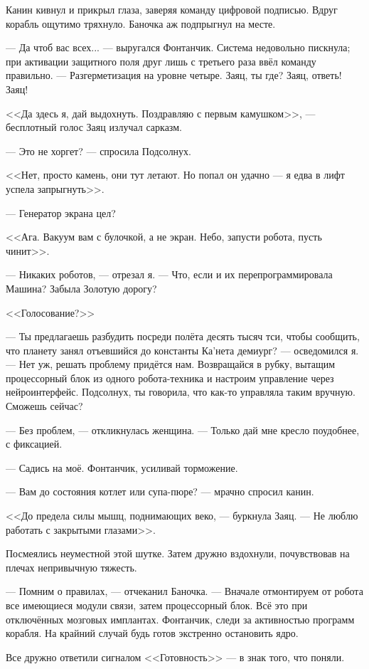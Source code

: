 Канин кивнул и прикрыл глаза, заверяя команду цифровой подписью.
Вдруг корабль ощутимо тряхнуло.
Баночка аж подпрыгнул на месте.

--- Да чтоб вас всех... --- выругался Фонтанчик.
Система недовольно пискнула;
при активации защитного поля друг лишь с третьего раза ввёл команду правильно.
--- Разгерметизация на уровне четыре.
Заяц, ты где?
Заяц, ответь!
Заяц!

<<Да здесь я, дай выдохнуть.
Поздравляю с первым камушком>>, --- бесплотный голос Заяц излучал сарказм.

--- Это не хоргет? --- спросила Подсолнух.

<<Нет, просто камень, они тут летают.
Но попал он удачно --- я едва в лифт успела запрыгнуть>>.

--- Генератор экрана цел?

<<Ага.
Вакуум вам с булочкой, а не экран.
Небо, запусти робота, пусть чинит>>.

--- Никаких роботов, --- отрезал я.
--- Что, если и их перепрограммировала Машина?
Забыла Золотую дорогу?

<<Голосование?>>

--- Ты предлагаешь разбудить посреди полёта десять тысяч тси, чтобы сообщить, что планету занял отъевшийся до константы Ка'нета демиург? --- осведомился я.
--- Нет уж, решать проблему придётся нам.
Возвращайся в рубку, вытащим процессорный блок из одного робота-техника и настроим управление через нейроинтерфейс. Подсолнух, ты говорила, что как-то управляла таким вручную.
Сможешь сейчас?

--- Без проблем, --- откликнулась женщина.
--- Только дай мне кресло поудобнее, с фиксацией.

--- Садись на моё.
Фонтанчик, усиливай торможение.

--- Вам до состояния котлет или супа-пюре? --- мрачно спросил канин.

<<До предела силы мышц, поднимающих веко, --- буркнула Заяц.
--- Не люблю работать с закрытыми глазами>>.

Посмеялись неуместной этой шутке.
Затем дружно вздохнули, почувствовав на плечах непривычную тяжесть.

--- Помним о правилах, --- отчеканил Баночка.
--- Вначале отмонтируем от робота все имеющиеся модули связи, затем процессорный блок.
Всё это при отключённых мозговых имплантах.
Фонтанчик, следи за активностью программ корабля.
На крайний случай будь готов экстренно остановить ядро.

Все дружно ответили сигналом <<Готовность>> --- в знак того, что поняли.

